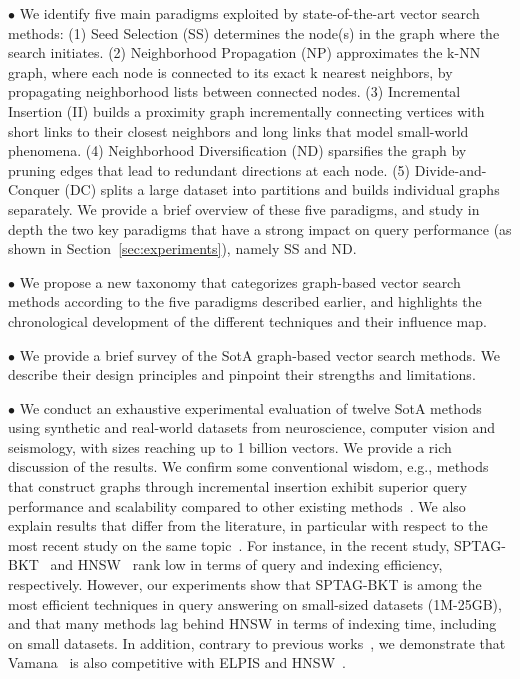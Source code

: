 \noindent$\bullet$ We identify five main paradigms exploited by state-of-the-art vector search methods: %
(1) Seed Selection (SS) determines the node(s) in the graph where the search initiates. 
(2) Neighborhood Propagation (NP) approximates the k-NN graph, where each node is connected to its exact k nearest neighbors, by propagating neighborhood lists between connected nodes.
(3) Incremental Insertion (II) builds a proximity graph incrementally connecting vertices with short links to their closest neighbors and long links that model small-world phenomena. 
(4) Neighborhood Diversification (ND) sparsifies the graph by pruning edges that lead to redundant directions at each node.
(5) Divide-and-Conquer (DC) splits a large dataset into partitions and builds individual graphs separately. 
We provide a brief overview of these five paradigms, and study in depth the two key paradigms that have a strong impact on query performance (as shown in Section~\ref{sec:experiments}), namely SS and ND. 

\noindent$\bullet$ We propose a new taxonomy that categorizes graph-based vector search methods according to the five paradigms described earlier, and highlights the chronological development of the different techniques and their influence map. 

\noindent$\bullet$ We provide a brief survey of the SotA graph-based vector search methods. We describe their design principles and pinpoint their strengths and limitations.

\noindent$\bullet$ We conduct an exhaustive experimental evaluation of twelve SotA methods using synthetic and real-world datasets from neuroscience, computer vision and seismology, with sizes reaching up to 1 billion vectors. We provide a rich discussion of the results. 
We confirm some conventional wisdom, e.g., methods that construct graphs through incremental insertion exhibit superior query performance and scalability compared to other existing methods~\cite{elpis,graph-survey-vldb}. We also explain results that differ from the literature, in particular with respect to the most recent study on the same topic~\cite{graph-survey-vldb}. For instance, in the recent study, SPTAG-BKT~\cite{SPTAG4} and HNSW~\cite{hnsw} rank low in terms of query and indexing efficiency, respectively. 
However, our experiments show that SPTAG-BKT is among the most efficient techniques in query answering on small-sized datasets (1M-25GB), and that many methods lag behind HNSW in terms of indexing time, including on small datasets. 
In addition, contrary to previous works~\cite{elpis}, we demonstrate that Vamana~\cite{vamana} is also competitive with ELPIS and HNSW~\cite{elpis,hnsw}. 

